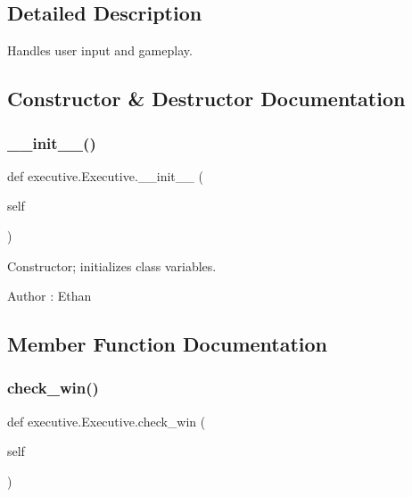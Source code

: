 \subsection{Detailed Description}
Handles user input and gameplay. 

\subsection{Constructor \& Destructor Documentation}
\mbox{\label{classexecutive_1_1_executive_ac80ddb6446f931e0c83db8c38d55bd6f}} 
\subsubsection{\texorpdfstring{\+\_\+\+\_\+init\+\_\+\+\_\+()}{\_\_init\_\_()}}
{\footnotesize\ttfamily def executive.\+Executive.\+\_\+\+\_\+init\+\_\+\+\_\+ (\begin{DoxyParamCaption}\item[{}]{self }\end{DoxyParamCaption})}



Constructor; initializes class variables. 

\begin{DoxyAuthor}{Author}
\+: Ethan 
\end{DoxyAuthor}


\subsection{Member Function Documentation}
\mbox{\label{classexecutive_1_1_executive_a79dbdc41718e33faf8cc4a982ed40a32}} 
\subsubsection{\texorpdfstring{check\+\_\+win()}{check\_win()}}
{\footnotesize\ttfamily def executive.\+Executive.\+check\+\_\+win (\begin{DoxyParamCaption}\item[{}]{self }\end{DoxyParamCaption})}



